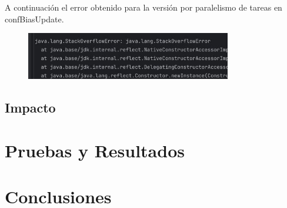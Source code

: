 \documentclass{article}
\begin{document}
    A continuación el error obtenido para la versión por paralelismo de tareas en confBiasUpdate.

    \begin{figure}[H]
      \centering
      \includegraphics[width=0.8\textwidth]{images/stackOverFlow.jpg}
    \end{figure}

    \subsection{Impacto}

  \section{Pruebas y Resultados}

  \section{Conclusiones}
\end{document}
